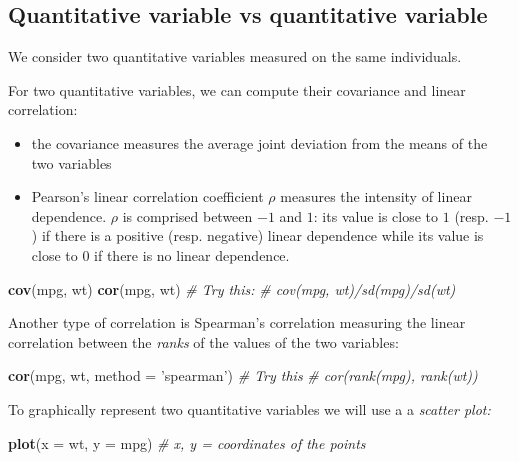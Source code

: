 \documentclass[]{book}
\newenvironment{Shaded}{\begin{snugshade}}{\end{snugshade}}
\newcommand{\CommentTok}[1]{\textcolor[rgb]{0.56,0.35,0.01}{\textit{#1}}}
\newcommand{\DataTypeTok}[1]{\textcolor[rgb]{0.13,0.29,0.53}{#1}}
\newcommand{\KeywordTok}[1]{\textcolor[rgb]{0.13,0.29,0.53}{\textbf{#1}}}
\newcommand{\NormalTok}[1]{#1}
\newcommand{\StringTok}[1]{\textcolor[rgb]{0.31,0.60,0.02}{#1}}
\providecommand{\tightlist}{%
  \setlength{\itemsep}{0pt}\setlength{\parskip}{0pt}}
\begin{document}
\hypertarget{quantitative-variable-vs-quantitative-variable}{%
\subsection{Quantitative variable vs quantitative variable}\label{quantitative-variable-vs-quantitative-variable}}

We consider two quantitative variables measured on the same individuals.

For two quantitative variables, we can compute their covariance and linear correlation:

\begin{itemize}
\tightlist
\item
  the covariance measures the average joint deviation from the means of the two variables
\item
  Pearson's linear correlation coefficient \(\rho\) measures the intensity of linear dependence. \(\rho\) is comprised between \(-1\) and \(1\): its value is close to \(1\) (resp. \(-1\)) if there is a positive (resp. negative) linear dependence while its value is close to \(0\) if there is no linear dependence.
\end{itemize}

\begin{Shaded}
\begin{Highlighting}[]
\KeywordTok{cov}\NormalTok{(mpg, wt)}
\KeywordTok{cor}\NormalTok{(mpg, wt)}
\CommentTok{# Try this:}
\CommentTok{# cov(mpg, wt)/sd(mpg)/sd(wt)}
\end{Highlighting}
\end{Shaded}

Another type of correlation is Spearman's correlation measuring the linear correlation between the \emph{ranks} of the values of the two variables:

\begin{Shaded}
\begin{Highlighting}[]
\KeywordTok{cor}\NormalTok{(mpg, wt, }\DataTypeTok{method =} \StringTok{'spearman'}\NormalTok{)}
\CommentTok{# Try this}
\CommentTok{# cor(rank(mpg), rank(wt))}
\end{Highlighting}
\end{Shaded}

To graphically represent two quantitative variables we will use a a \emph{scatter plot:}

\begin{Shaded}
\begin{Highlighting}[]
\KeywordTok{plot}\NormalTok{(}\DataTypeTok{x =}\NormalTok{ wt, }\DataTypeTok{y =}\NormalTok{ mpg) }\CommentTok{# x, y = coordinates of the points}
\end{Highlighting}
\end{Shaded}
\end{document}

